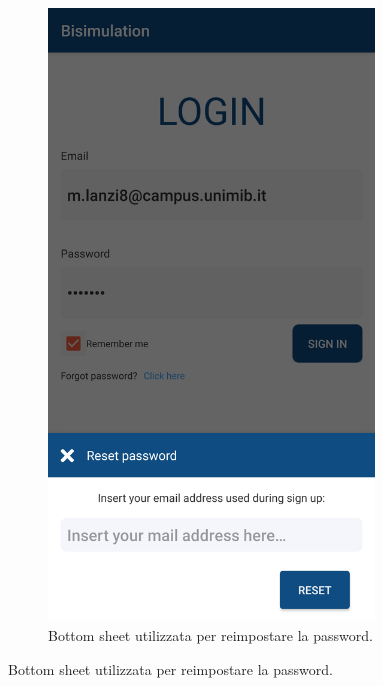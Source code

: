 \documentclass[a4paper,11pt,twoside,openright]{report}
\begin{document}
\begin{figure}[h]
\begin{subfigure}{.5\textwidth}
  \includegraphics[width=.4\linewidth,height=460pt,keepaspectratio]{images/BottomSheet.png}
  \caption{Bottom sheet utilizzata per reimpostare la password.}
\end{subfigure}
\end{figure}
\end{document}
